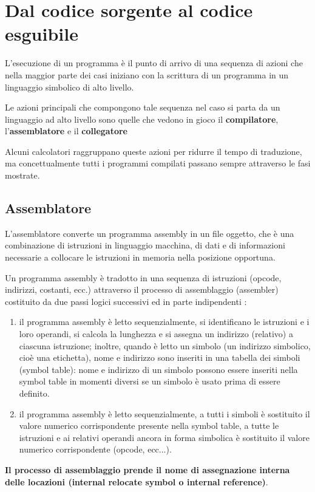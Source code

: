 \documentclass[12pt]{article}
\begin{document}
\newpage
\section{Dal codice sorgente al codice esguibile}
L’esecuzione di un programma è il punto di arrivo di una sequenza di azioni che nella maggior parte dei casi iniziano con la scrittura di un programma in un linguaggio simbolico di alto livello.\par\medskip\noindent
Le azioni principali che compongono tale sequenza nel caso si parta da un linguaggio ad alto livello sono quelle che vedono in gioco il \textbf{compilatore}, l’\textbf{assemblatore} e il \textbf{collegatore}\par\medskip\noindent 
Alcuni calcolatori raggruppano queste azioni per ridurre il tempo di traduzione, ma concettualmente tutti i programmi compilati passano sempre attraverso le fasi mostrate.\par\medskip\noindent
\subsection{Assemblatore}
L’assemblatore converte un programma assembly in un file oggetto, che è una combinazione di istruzioni in linguaggio macchina, di dati e di informazioni necessarie a collocare le istruzioni in memoria nella posizione opportuna. \par\medskip\noindent
Un programma assembly è tradotto in una sequenza di istruzioni (opcode, indirizzi, costanti, ecc.) attraverso il processo di assemblaggio (assembler) costituito da due passi logici successivi ed in parte indipendenti :
\begin{enumerate}
    \item  il programma assembly è letto sequenzialmente, si identificano le istruzioni e i loro operandi, si calcola la lunghezza e si assegna un indirizzo (relativo) a ciascuna istruzione; inoltre, quando è letto un simbolo (un indirizzo simbolico, cioè una etichetta), nome e indirizzo sono inseriti in una tabella dei simboli (symbol table): nome e indirizzo di un simbolo possono essere inseriti nella symbol table in momenti diversi se un simbolo è usato prima di essere definito.
    \item il programma assembly è letto sequenzialmente, a tutti i simboli è sostituito il valore numerico corrispondente presente nella symbol table, a tutte le istruzioni e ai relativi operandi ancora in forma simbolica è sostituito il valore numerico corrispondente (opcode, ecc...).
\end{enumerate}
\textbf{Il processo di assemblaggio prende il nome di assegnazione interna delle locazioni (internal relocate symbol o internal reference)}.
\newpage
\end{document}
